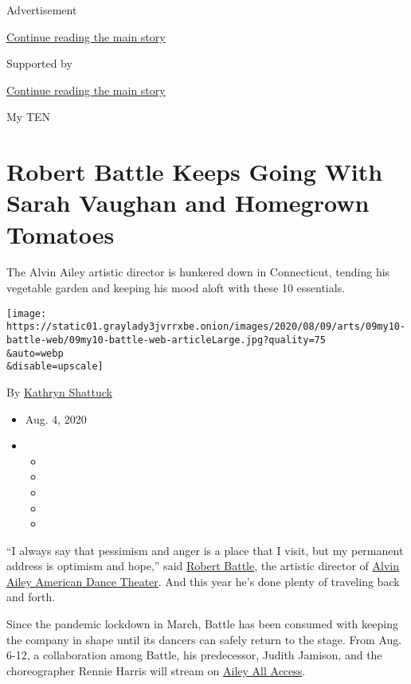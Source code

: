 Advertisement

\protect\hyperlink{after-top}{Continue reading the main story}

Supported by

\protect\hyperlink{after-sponsor}{Continue reading the main story}

My TEN

\hypertarget{robert-battle-keeps-going-with-sarah-vaughan-and-homegrown-tomatoes}{%
\section{Robert Battle Keeps Going With Sarah Vaughan and Homegrown
Tomatoes}\label{robert-battle-keeps-going-with-sarah-vaughan-and-homegrown-tomatoes}}

The Alvin Ailey artistic director is hunkered down in Connecticut,
tending his vegetable garden and keeping his mood aloft with these 10
essentials.

\texttt{[image: https://static01.graylady3jvrrxbe.onion/images/2020/08/09/arts/09my10-battle-web/09my10-battle-web-articleLarge.jpg?quality=75\\\&auto=webp\\\&disable=upscale]}

By \href{https://www.nytimes3xbfgragh.onion/by/kathryn-shattuck}{Kathryn
Shattuck}

\begin{itemize}
\item
  Aug. 4, 2020
\item
  \begin{itemize}
  \item
  \item
  \item
  \item
  \item
  \end{itemize}
\end{itemize}

``I always say that pessimism and anger is a place that I visit, but my
permanent address is optimism and hope,'' said
\href{https://www.alvinailey.org/alvin-ailey-american-dance-theater/robert-battle}{Robert
Battle}, the artistic director of
\href{https://www.alvinailey.org/}{Alvin Ailey American Dance Theater}.
And this year he's done plenty of traveling back and forth.

Since the pandemic lockdown in March, Battle has been consumed with
keeping the company in shape until its dancers can safely return to the
stage. From Aug. 6-12, a collaboration among Battle, his predecessor,
Judith Jamison, and the choreographer Rennie Harris will stream on
\href{https://www.alvinailey.org/performances-tickets/ailey-all-access}{Ailey
All Access}.

